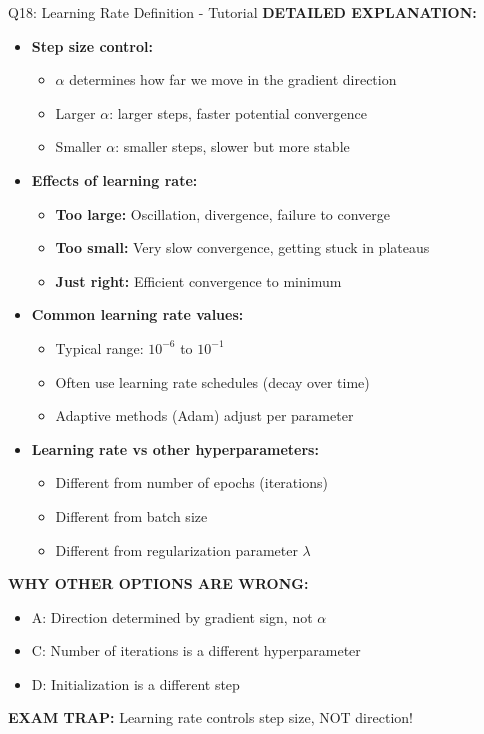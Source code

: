 \documentclass[8pt]{beamer}
\begin{document}
\begin{frame}{Q18: Learning Rate Definition - Tutorial}
		\vspace{0.05cm}
		\textbf{DETAILED EXPLANATION:}
		\begin{itemize}
			\item \textbf{Step size control:}
			\begin{itemize}
				\item $\alpha$ determines how far we move in the gradient direction
				\item Larger $\alpha$: larger steps, faster potential convergence
				\item Smaller $\alpha$: smaller steps, slower but more stable
			\end{itemize}
			\item \textbf{Effects of learning rate:}
			\begin{itemize}
				\item \textbf{Too large:} Oscillation, divergence, failure to converge
				\item \textbf{Too small:} Very slow convergence, getting stuck in plateaus
				\item \textbf{Just right:} Efficient convergence to minimum
			\end{itemize}
			\item \textbf{Common learning rate values:}
			\begin{itemize}
				\item Typical range: $10^{-6}$ to $10^{-1}$
				\item Often use learning rate schedules (decay over time)
				\item Adaptive methods (Adam) adjust per parameter
			\end{itemize}
			\item \textbf{Learning rate vs other hyperparameters:}
			\begin{itemize}
				\item Different from number of epochs (iterations)
				\item Different from batch size
				\item Different from regularization parameter $\lambda$
			\end{itemize}
		\end{itemize}
		
		\vspace{0.05cm}
		\textcolor{myred}{\textbf{WHY OTHER OPTIONS ARE WRONG:}}
		\begin{itemize}
			\item \textcolor{myred}{A:} Direction determined by gradient sign, not $\alpha$
			\item \textcolor{myred}{C:} Number of iterations is a different hyperparameter
			\item \textcolor{myred}{D:} Initialization is a different step
		\end{itemize}
		
		\textcolor{myred}{\textbf{EXAM TRAP:}} Learning rate controls \textcolor{myblue}{step size}, NOT direction!
	\end{frame}
	
\end{document}

